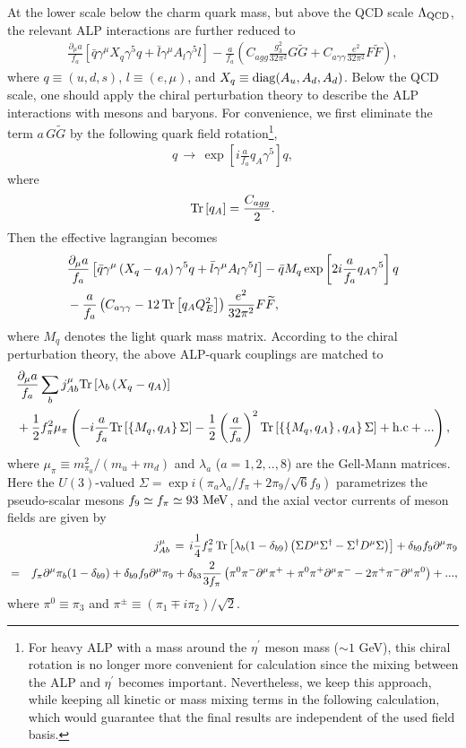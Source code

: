 \documentclass[preprint,prd,aps,tighten,nofootinbib,amssymb]{revtex4}
\newcommand{\bea}{\begin{eqnarray}}
\newcommand{\eea}{\end{eqnarray}}
\newcommand{\dis}[1]{\begin{equation}\begin{split}#1\end{split}\end{equation}}
\def\vpq{f_{a}}
\begin{document}
At the lower scale below the charm quark mass, but above the QCD scale $\Lambda_{\rm QCD}$, the relevant ALP interactions  are further reduced to 
\dis{
\frac{\partial_\mu a}{\vpq} \left[\bar{q} \gamma^\mu X_q \gamma^5 q + \bar{l} \gamma^\mu A_l  \gamma^5  l\right] - \frac{a}{\vpq}\left( C_{agg}\frac{g_3^2}{32\pi^2}G\widetilde{G} + C_{a\gamma\gamma}\frac{e^2}{32\pi^2}F\widetilde{F} \right),
}
where $q \equiv (u,d,s)$, $l \equiv (e,\mu)$, and $X_q \equiv {\rm diag}(A_u, A_d, A_d)$. 
Below the QCD scale, one should apply the chiral perturbation theory to describe the ALP interactions with mesons and baryons.  
For convenience, we first eliminate the term $a\, G\widetilde{G}$ by the following quark field rotation\footnote{For heavy ALP with a mass around the $\eta^\prime$ meson mass ($\sim 1$ GeV), this chiral rotation is no longer more convenient for calculation since the mixing between the ALP and $\eta^\prime$ becomes important. Nevertheless, we keep this approach, while keeping all kinetic or mass mixing terms in the following calculation, which would guarantee that the final results are independent of the used field basis.},
\bea
q \, \rightarrow \, \exp\left[i\frac{a}{\vpq}q_A\gamma^5\right]q,
\eea
where
\bea
{\rm Tr}\left[q_A\right] =\frac{C_{agg}}{2}.
\eea
Then the effective lagrangian becomes
\dis{
 &\frac{\partial_\mu a}{\vpq} \left[\bar{q} \gamma^\mu \left(X_q -q_A\right) \gamma^5  q + \bar{l} \gamma^\mu A_l \gamma^5  l\right] -  \bar{q}  M_q \exp \left[2i\frac{a}{\vpq}q_A\gamma^5 \right] q\\
& - \frac{a}{\vpq} \left(C_{a\gamma\gamma} -12\, {\rm Tr}\left[q_AQ_E^2\right] \right)\frac{e^2}{32\pi^2}F\widetilde{F},
}
where $M_q$ denotes the light quark mass matrix.
According to the chiral perturbation theory, the above ALP-quark couplings are matched to
\dis{
& \frac{\partial_\mu a}{\vpq}\sum_{b} j^{\mu}_{Ab} {\rm Tr}\left[\lambda_b \left( X_q - q_A\right) \right]\\
& +  \frac{1}{2}f_\pi^2\mu_\pi \left(- i\frac{a}{\vpq}{\rm Tr}\left[ \left\{ M_q,q_A \right\} \Sigma\right] -\frac{1}{2}\left(\frac{a}{\vpq}\right)^2{\rm Tr}\left[  \left\{ \left\{ M_q ,q_A \right\},q_A\right\}\Sigma\right] +{\rm h.c}+... \right),
}
where $\mu_\pi \equiv m_{\pi_0}^2 / (m_u + m_d)$ and $\lambda_a$ ($a=1,2,..,8$) are the Gell-Mann matrices. Here
the $U(3)$-valued
$\Sigma = \exp i\left({\pi_a}\lambda_a/{f_\pi} + 2{\pi_9}/\sqrt{6}{f_9}  \right)$ parametrizes 
the  pseudo-scalar mesons 
$f_9 \simeq f_\pi \simeq 93 ~{\rm MeV}$,
and the axial vector currents of meson fields are given by
\bea
&& j^\mu_{Ab} \,=\, i\frac{1}{4}f_\pi^2 \,{\rm Tr} \left[ \lambda_{b}(1-\delta_{b9})\left( \Sigma D^\mu \Sigma^{\dagger} - \Sigma^{\dagger} D^\mu \Sigma\right)\right] + \delta_{b9} f_9\partial^\mu \pi_9 \nonumber \\
&=&  f_\pi\partial^\mu \pi_{b} (1- \delta_{b9}) + \delta_{b9} f_{9}\partial^\mu \pi_9 + \delta_{b3} \frac{2}{3f_\pi}\left(\pi^0\pi^-\partial^\mu \pi^+ + \pi^0 \pi^+\partial^\mu \pi^- - 2\pi^+\pi^-\partial^\mu \pi^0\right)+ ...,
\nonumber \eea
where $\pi^0 \equiv \pi_3$ and $\pi^\pm \equiv (\pi_1 \mp i \pi_2)/\sqrt{2}$.
\end{document}
